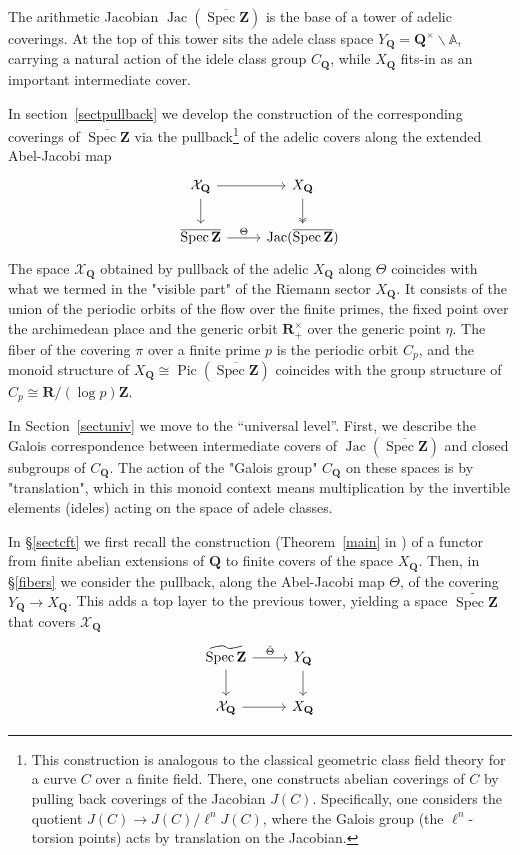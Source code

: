 \documentclass[11pt,a4paper]{article}
\newcommand{\Q}{\mathbf{Q}}
\newcommand{\Z}{\mathbf{Z}}
\newcommand{\R}{\mathbf{R}}
\newcommand{\A}{\mathbb{A}}
\newcommand{\XQ}{X_{\Q}}
\newcommand{\YQ}{Y_{\Q}}
\newcommand{\CQ}{C_{\Q}}
\def\spz{\Spec \Z}
\def\spzb{\overline{\Spec \Z}}
\newcommand{\Spec}{\operatorname{Spec}}
\def\Pic{\operatorname{Pic}}
\def\Jac{\operatorname{Jac}}
\def\spz{\Spec \Z}
\theoremstyle{plain}
\theoremstyle{definition} %
\begin{document}
The  arithmetic Jacobian  $\Jac(\spzb)$ is the base of a tower of adelic coverings.
At the top of this tower sits the adele class space $\YQ = \Q^\times \backslash \A$, carrying a natural action of the idele class group $\CQ$, while $\XQ$ fits-in as an important intermediate cover. 


In section~\ref{sectpullback} we develop the construction of the corresponding coverings  of $\spzb$ via the pullback\footnote{This construction is  analogous to the classical geometric class field theory for a curve $C$ over a finite field. There, one constructs abelian coverings of $C$ by pulling back coverings of the Jacobian $J(C)$. Specifically, one considers the quotient $J(C) \to J(C)/\ell^n J(C)$, where the Galois group (the $\ell^n$-torsion points) acts by translation on the Jacobian. } of the adelic covers along the extended Abel-Jacobi map 
\[
\begin{tikzcd}
\mathcal{X}_\Q \arrow[r] \arrow[d] & X_\Q \arrow[d,two heads] \\
\spzb \arrow[r, "\Theta"] & \Jac(\spzb)
\end{tikzcd}
\]
The space $\mathcal{X}_\Q$ obtained by  pullback of the adelic $X_\Q$ along $\Theta$ coincides with what we termed in \cite{CC3} the "visible part" of the Riemann sector $X_\Q$. It consists of the union of the periodic orbits of the flow over the finite primes, the fixed point over the archimedean place and the generic orbit $\R^\times_+$ over the generic point $\eta$. The fiber of the  covering  $\pi$ over a finite prime $p$ is  the periodic orbit $C_p$, and the monoid structure of $X_\Q\cong \Pic(\spzb)$  coincides with the group structure of $C_p \cong \R / (\log p)\Z$.\vspace{.03in}

In Section~\ref{sectuniv} we  move to the ``universal level''. First, we describe the Galois correspondence  between intermediate covers of $\Jac(\spzb)$ and   closed subgroups of $\CQ$. The action of the "Galois group" $\CQ$ on these spaces is by "translation", which in this monoid context means multiplication by the invertible elements (ideles) acting on the space of adele classes.

In  \S \ref{sectcft} we first recall the construction (Theorem~\ref{main} in \cite{CC3}) of a functor from finite abelian extensions of $\Q$ to finite covers of the space $X_\Q$.
Then, in \S \ref{fibers} we consider the pullback, along the Abel-Jacobi map $\Theta$, of the covering $\YQ \to \XQ$. This adds a top layer to the previous tower, yielding a space $\widetilde{\spz}$ that covers $\mathcal{X}_\Q$
\[
\begin{tikzcd}
\widetilde{\spz} \arrow[r,"\tilde\Theta"]\arrow[d] & Y_\Q\arrow[d]
\\
\mathcal{X}_\Q \arrow[r]  & X_\Q 
\end{tikzcd}
\]
\end{document}
